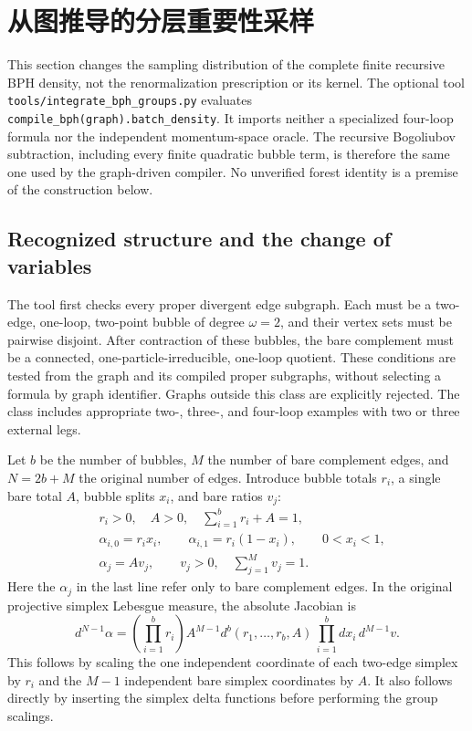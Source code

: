 \section{从图推导的分层重要性采样}
\label{sec:grouped-sampling}

This section changes the sampling distribution of the complete finite
recursive BPH density, not the renormalization prescription or its kernel.
The optional tool \texttt{tools/integrate\_bph\_groups.py} evaluates
\texttt{compile\_bph(graph).batch\_density}.  It imports neither a specialized
four-loop formula nor the independent momentum-space oracle.  The recursive
Bogoliubov subtraction, including every finite quadratic bubble term, is
therefore the same one used by the graph-driven compiler.  No unverified
forest identity is a premise of the construction below.

\subsection{Recognized structure and the change of variables}

The tool first checks every proper divergent edge subgraph.  Each must be a
two-edge, one-loop, two-point bubble of degree $\omega=2$, and their vertex
sets must be pairwise disjoint.  After contraction of these bubbles, the
bare complement must be a connected, one-particle-irreducible, one-loop
quotient.  These conditions are tested from the graph and its compiled
proper subgraphs, without selecting a formula by graph identifier.  Graphs
outside this class are explicitly rejected.  The class includes appropriate
two-, three-, and four-loop examples with two or three external legs.

Let $b$ be the number of bubbles, $M$ the number of bare complement edges,
and $N=2b+M$ the original number of edges.  Introduce bubble totals $r_i$,
a single bare total $A$, bubble splits $x_i$, and bare ratios $v_j$:
\begin{align*}
 &r_i>0,\quad A>0,\quad \sum_{i=1}^b r_i+A=1,\\
 &\alpha_{i,0}=r_i x_i,\qquad
   \alpha_{i,1}=r_i(1-x_i),\qquad 0<x_i<1,\\
 &\alpha_j=A v_j,\qquad v_j>0,\quad \sum_{j=1}^M v_j=1.
\end{align*}
Here the $\alpha_j$ in the last line refer only to bare complement edges.
In the original projective simplex Lebesgue measure, the absolute
Jacobian is
\begin{equation}
 d^{N-1}\alpha=
 \left(\prod_{i=1}^b r_i\right) A^{M-1}
 d^b(r_1,\ldots,r_b,A)\,
 \prod_{i=1}^b dx_i\,d^{M-1}v.
 \label{eq:hierarchical-jacobian}
\end{equation}
This follows by scaling the one independent coordinate of each two-edge
simplex by $r_i$ and the $M-1$ independent bare simplex coordinates by $A$.
It also follows directly by inserting the simplex delta functions before
performing the group scalings.

